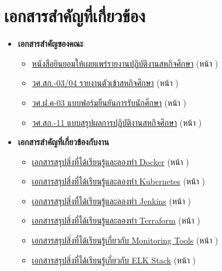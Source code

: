 \chapter{เอกสารสำคัญที่เกี่ยวข้อง}
\begin{itemize}
    \item \textbf{เอกสารสำคัญของคณะ}
          \begin{itemize}
              \item \hyperlink{target:approval}{หนังสือยินยอมให้เผยแพร่รายงานปฏิบัติงานสหกิจศึกษา} (หน้า \pageref{page:approval})
              \item \hyperlink{target:03-04}{วศ.สก.-03/04 รายงานตัวเข้าสหกิจศึกษา} (หน้า \pageref{page:03-04})
              \item \hyperlink{target:03}{วศ.ฝ.ค-03 แบบฟอร์มยืนยันการรับนักศึกษา} (หน้า \pageref{page:03})
              \item \hyperlink{target:11}{วศ.สก.-11 แบบสรุปผลการปฏิบัติงานสหกิจศึกษา} (หน้า \pageref{page:11})
          \end{itemize}
    \item \textbf{เอกสารสำคัญที่เกี่ยวข้องกับงาน}
          \begin{itemize}
              \item \hyperlink{target:docker}{เอกสารสรุปสิ่งที่ได้เรียนรู้และลองทำ Docker} (หน้า \pageref{page:docker})
              \item \hyperlink{target:kube}{เอกสารสรุปสิ่งที่ได้เรียนรู้และลองทำ Kubernetes} (หน้า \pageref{page:kube})
              \item \hyperlink{target:jenkins}{เอกสารสรุปสิ่งที่ได้เรียนรู้และลองทำ Jenkins} (หน้า \pageref{page:jenkins})
              \item \hyperlink{target:terraform}{เอกสารสรุปสิ่งที่ได้เรียนรู้และลองทำ Terraform} (หน้า \pageref{page:terraform})
              \item \hyperlink{target:monitoring}{เอกสารสรุปสิ่งที่ได้เรียนรู้เกี่ยวกับ Monitoring Tools} (หน้า \pageref{page:monitoring})
              \item \hyperlink{target:elk}{เอกสารสรุปสิ่งที่ได้เรียนรู้เกี่ยวกับ ELK Stack} (หน้า \pageref{page:elk})
          \end{itemize}
\end{itemize}






